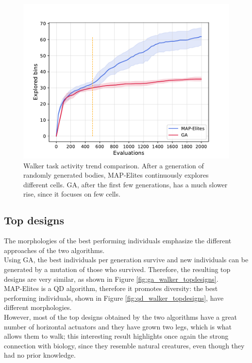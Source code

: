 \begin{figure}[h]
    \centering
    \includegraphics[scale=0.65]{images/body_opt/comp_qd_ga_w_at}
    \caption{Walker task activity trend comparison. After a generation of randomly generated bodies, MAP-Elites continuously explores different cells. GA, after the first few generations, has a much slower rise, since it focuses on few cells.}
    \label{fig:qd_ga_walker_at}
\end{figure}

\subsection{Top designs}
The morphologies of the best performing individuals emphasize the different approaches of the two algorithms.\\
Using GA, the best individuals per generation survive and new individuals can be generated by a mutation of those who survived. Therefore, the resulting top designs are very similar, as shown in Figure \ref{fig:ga_walker_topdesigns}.\\
MAP-Elites is a QD algorithm, therefore it promotes diversity: the best performing individuals, shown in Figure \ref{fig:qd_walker_topdesigns}, have different morphologies.\\
However, most of the top designs obtained by the two algorithms have a great number of horizontal actuators and they have grown two legs, which is what allows them to walk; this interesting result highlights once again the strong connection with biology, since they resemble natural creatures, even though they had no prior knowledge.

